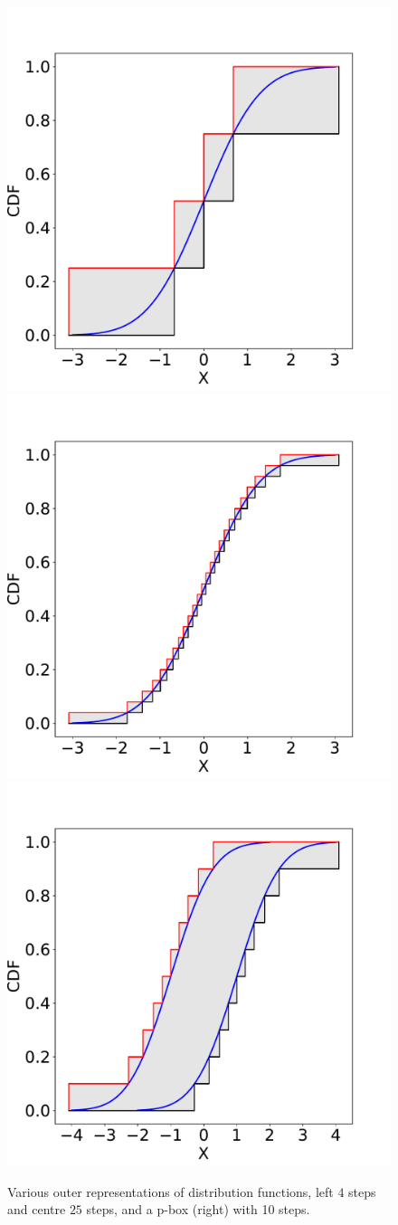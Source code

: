 \documentclass{juliacon}
\begin{document}
\begin{figure}[htp]

  \centering
  \includegraphics[width=.3\textwidth]{../examples/JuliaCon/fig2/fig2_pbox2.pdf}\hfill
  \includegraphics[width=.3\textwidth]{../examples/JuliaCon/fig2/fig2_pbox1.pdf}\hfill
  \includegraphics[width=.3\textwidth]{../examples/JuliaCon/fig2/fig2_pbox3.pdf}
  
  \caption{Various outer representations of distribution functions, left $4$ steps and centre $25$ steps, and a p-box (right) with 10 steps.}
  \label{fig:figure2}
  
\end{figure}

\end{document}
